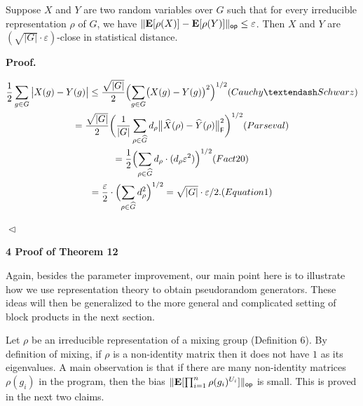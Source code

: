 \documentclass[10pt,a4paper]{article}
\begin{document}
Suppose $X$ and $Y$ are two random variables over $G$ such that for every irreducible representation $\rho$ of $G$, we have $\lVert\mathop{\bf E\/}[\rho(X)]-\mathop{\bf E\/}[\rho(Y)]\rVert_{\mathsf{op}}\leq\varepsilon$.
Then $X$ and $Y$ are $(\sqrt{\lvert G\rvert}\cdot\varepsilon)$-close in statistical distance.\par







\par\medskip\noindent\textbf{
\textbf{Proof}.}\par




\[\begin{gathered}
\displaystyle\frac{1}{2}\sum_{g\in G}\big{\lvert}X(g)-Y(g)\big{\rvert} \displaystyle\leq\frac{\sqrt{\lvert G\rvert}}{2}\Bigl{(}\sum_{g\in G}\bigl{(}X(g)-Y(g)\bigr{)}^{2}\Bigr{)}^{1/2} (Cauchy–Schwarz) \\
\displaystyle=\frac{\sqrt{\lvert G\rvert}}{2}\biggl{(}\frac{1}{\lvert G\rvert}\sum_{\rho\in\widehat{G}}d_{\rho}\big{\lVert}\widehat{X}(\rho)-\widehat{Y}(\rho)\big{\rVert}_{\mathsf{F}}^{2}\biggr{)}^{1/2} (Parseval) \\
\displaystyle=\frac{1}{2}\Bigl{(}\sum_{\rho\in\widehat{G}}d_{\rho}\cdot(d_{\rho}\varepsilon^{2})\Bigr{)}^{1/2} (Fact 20) \\
\displaystyle=\frac{\varepsilon}{2}\cdot\Bigl{(}\sum_{\rho\in\widehat{G}}d_{\rho}^{2}\Bigr{)}^{1/2}=\sqrt{\lvert G\rvert}\cdot\varepsilon/2. (Equation 1)
\end{gathered}\]


$\vartriangleleft$\par






\par\medskip\noindent\textbf{
4 Proof of Theorem 12
}\par




Again, besides the parameter improvement, our main point here is to illustrate how we use representation theory to obtain pseudorandom generators. These ideas will then be generalized to the more general and complicated setting of block products in the next section.\par




Let $\rho$ be an irreducible representation of a mixing group (Definition 6).
By definition of mixing, if $\rho$ is a non-identity matrix then it does not have $1$ as its eigenvalues.
A main observation is that if there are many non-identity matrices $\rho(g_{i})$ in the program, then the bias $\lVert\mathop{\bf E\/}[\prod_{i=1}^{n}\rho(g_{i})^{U_{i}}]\rVert_{\mathsf{op}}$ is small. This is proved in the next two claims.\par
\end{document}
